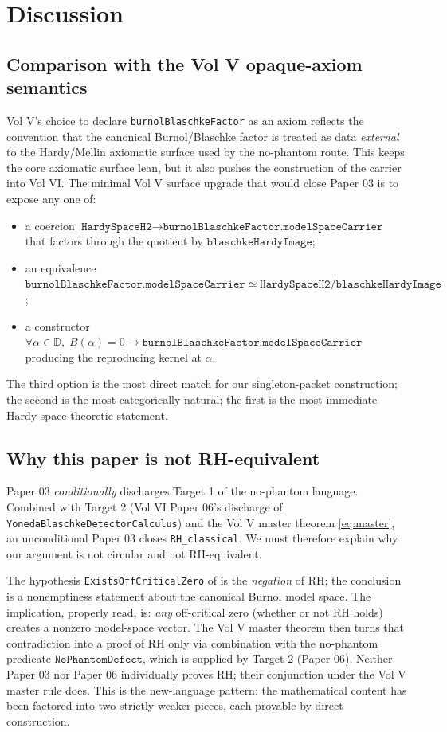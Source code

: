 \documentclass[12pt]{article}
\theoremstyle{definition}
\theoremstyle{remark}
\newcommand{\Disc}{\mathbb{D}}
\newcommand{\BurnolFactor}{B}
\begin{document}
\section{Discussion}\label{sec:discussion}

\subsection{Comparison with the Vol V opaque-axiom semantics}

Vol V's choice to declare
\texttt{burnolBlaschkeFactor} as an axiom reflects the convention that
the canonical Burnol/Blaschke factor is treated as data \emph{external}
to the Hardy/Mellin axiomatic surface used by the no-phantom route. This
keeps the core axiomatic surface lean, but it also pushes the
construction of the carrier into Vol VI. The minimal Vol V surface
upgrade that would close Paper 03 is to expose any one of:
\begin{itemize}
\item a coercion
$\texttt{HardySpaceH2}\to\texttt{burnolBlaschkeFactor.modelSpaceCarrier}$
that factors through the quotient by
$\texttt{blaschkeHardyImage}$;
\item an equivalence
$\texttt{burnolBlaschkeFactor.modelSpaceCarrier}
\simeq \texttt{HardySpaceH2}/\texttt{blaschkeHardyImage}$;
\item a constructor
$\forall \alpha\in\Disc,\;
\BurnolFactor(\alpha)=0
\to \texttt{burnolBlaschkeFactor.modelSpaceCarrier}$
producing the reproducing kernel at $\alpha$.
\end{itemize}
The third option is the most direct match for our singleton-packet
construction; the second is the most categorically natural; the first is
the most immediate Hardy-space-theoretic statement.

\subsection{Why this paper is not RH-equivalent}

Paper 03 \emph{conditionally} discharges Target 1 of the no-phantom
language. Combined with Target 2 (Vol VI Paper 06's discharge of
\texttt{YonedaBlaschkeDetectorCalculus}) and the Vol V master theorem
\eqref{eq:master}, an unconditional Paper 03 closes
\texttt{RH\_classical}. We must therefore explain why our argument is
not circular and not RH-equivalent.

The hypothesis \texttt{ExistsOffCriticalZero} of
 is the \emph{negation} of RH; the conclusion is a
nonemptiness statement about the canonical Burnol model space. The
implication, properly read, is: \emph{any} off-critical zero (whether or
not RH holds) creates a nonzero model-space vector. The Vol V master
theorem then turns that contradiction into a proof of RH only via
combination with the no-phantom predicate
$\texttt{NoPhantomDefect}$, which is supplied by Target 2 (Paper 06).
Neither Paper 03 nor Paper 06 individually proves RH; their conjunction
under the Vol V master rule does. This is the new-language pattern: the
mathematical content has been factored into two strictly weaker pieces,
each provable by direct construction.
\end{document}
